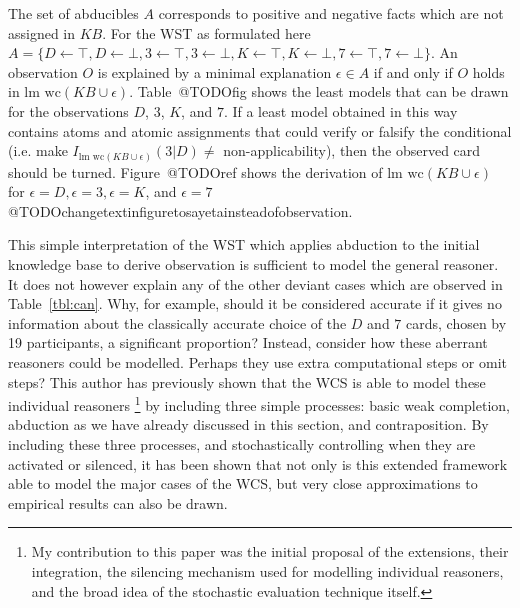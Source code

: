 The set of abducibles $A$ corresponds to positive and negative facts which are not assigned in $KB$. For the WST as formulated here $A=\{D\leftarrow \top,D\leftarrow \bot,3\leftarrow \top,3\leftarrow \bot,K\leftarrow \top,K\leftarrow \bot,7\leftarrow \top,7\leftarrow \bot\}$.
 An observation $O$ is explained by a minimal explanation $\epsilon \in A$ if and only if $O$ holds in $\textrm{lm wc}(KB\cup\epsilon)$. Table~@TODOfig shows the least models that can be drawn for the observations $D$, $3$, $K$, and $7$. If a least model obtained in this way contains atoms and atomic assignments that could verify or falsify the conditional (i.e. make $I_{\textrm{lm wc}(KB\cup \epsilon)}(3|D)\neq$ non-applicability), then the observed card should be turned. Figure~@TODOref shows the derivation of $\textrm{lm wc}(KB\cup \epsilon)$ for $\epsilon=D, \epsilon=3, \epsilon=K$, and $\epsilon=7$ @TODOchangetextinfiguretosayetainsteadofobservation.


This simple interpretation of the WST which applies abduction to the initial knowledge base to derive observation is sufficient to model the general reasoner. It does not however explain any of the other deviant cases which are observed in Table~\ref{tbl:can}. Why, for example, should it be considered accurate if it gives no information about the classically accurate choice of the $D$ and $7$ cards, chosen by 19 participants, a significant proportion? Instead, consider how these aberrant reasoners could be modelled. Perhaps they use extra computational steps or omit steps? This author has previously shown that the WCS is able to model these individual reasoners \citep{breu2019weak}\footnote{My contribution to this paper was the initial proposal of the extensions, their integration, the silencing mechanism used for modelling individual reasoners, and the broad idea of the stochastic evaluation technique itself.} by including three simple processes: basic weak completion, abduction as we have already discussed in this section, and contraposition. By including these three processes, and stochastically controlling when they are activated or silenced, it has been shown that not only is this extended framework able to model the major cases of the WCS, but very close approximations to empirical results can also be drawn.

